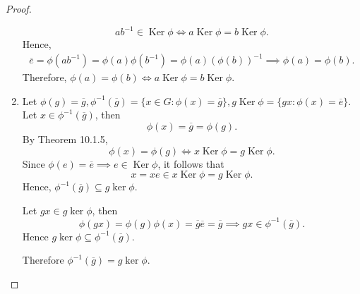 \documentclass{article}
\theoremstyle{definition}
\DeclareMathOperator{\Ker}{Ker}
\begin{document}
\begin{proof}
\begin{enumerate}
\begin{equation*}
               ab^{-1} \in \Ker\phi \iff a\Ker\phi = b\Ker\phi.
           \end{equation*}
           Hence,
           \begin{align*}
               \overline{e} = \phi(ab^{-1}) = \phi(a)\phi(b^{-1}) = \phi(a)(\phi(b))^{-1} \implies \phi(a)=\phi(b).
           \end{align*}
           Therefore, $\phi(a) = \phi(b) \iff a\Ker\phi = b\Ker\phi$.
           \item Let $\phi(g)=\overline{g}, \phi^{-1}(\overline{g})=\{x\in G:\phi(x)=\overline{g}\},g\Ker\phi=\{gx:\phi(x)=\overline{e}\}$. Let $x \in \phi^{-1}(\overline{g})$, then
           \begin{equation*}
               \phi(x) = \overline{g} = \phi(g).
           \end{equation*}
           By Theorem 10.1.5,
           \begin{equation*}
               \phi(x) = \phi(g) \iff x\Ker\phi = g\Ker\phi.
           \end{equation*}
           Since $\phi(e)=\overline{e} \implies e \in \Ker\phi$, it follows that
           \begin{equation*}
               x = xe \in x\Ker\phi = g\Ker\phi.
           \end{equation*}
           Hence, $\phi^{-1}(\overline{g}) \subseteq g\ker\phi$.
           
           Let $gx \in g\ker\phi$, then
           \begin{equation*}
               \phi(gx) = \phi(g)\phi(x) = \overline{g}\overline{e} = \overline{g} \implies gx \in \phi^{-1}(\overline{g}).
           \end{equation*}
           Hence $g\ker\phi \subseteq \phi^{-1}(\overline{g})$.
           
           Therefore $\phi^{-1}(\overline{g})=g\ker\phi$.
       \end{enumerate}
    \end{proof}
    
\end{document}
